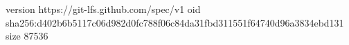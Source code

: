 version https://git-lfs.github.com/spec/v1
oid sha256:d402b6b5117c06d982d0fc788f06c84da31fbd311551f64740d96a3834ebd131
size 87536
